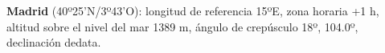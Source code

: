\documentclass[12pt]{article}
\begin{document}
 \footnotesize \noindent \textbf{Madrid} (40º25'N/3º43'O): longitud
 de referencia 15ºE, zona horaria +1 h, altitud sobre el nivel del mar
 1389 m, \'angulo de crep\'usculo 18º, \arabfalse\transtrue {}
 104.0º, declinaci\'on dedata.



 
\end{document}
